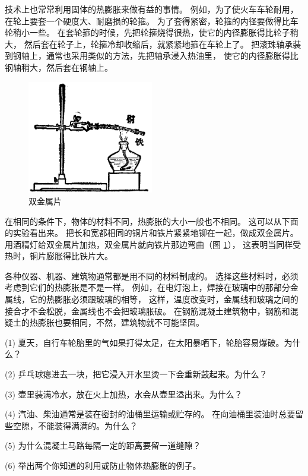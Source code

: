 技术上也常常利用固体的热膨胀来做有益的事情。
例如，为了使火车车轮耐用，在轮上要套一个硬度大、耐磨损的轮箍。
为了套得紧密，轮箍的内径要做得比车轮稍小一些。
在套轮箍的时候，先把轮箍烧得很热，使它的内径膨胀得比轮子稍大，
然后套在轮子上，轮箍冷却收缩后，就紧紧地箍在车轮上了。
把滚珠轴承装到钢轴上，通常也采用类似的方法，先把轴承浸入热油里，
使它的内径膨胀得比钢轴稍大，然后套在钢轴上。

\begin{figure}
    \centering
    \includegraphics[width=5.5cm]{../pic/czwl2-ch2-7}
    \caption{双金属片}\label{fig:2-7}
\end{figure}

在相同的条件下，物体的材料不同，热膨胀的大小一般也不相同。
这可以从下面的实验看出来。
把长和宽都相同的铜片和铁片紧紧地铆在一起，做成双金属片。
用酒精灯给双金属片加热，双金属片就向铁片那边弯曲（图 \ref{fig:2-7}），
这表明当同样受热时，铜片膨胀得比铁片大。

各种仪器、机器、建筑物通常都是用不同的材料制成的。
选择这些材料时，必须考虑到它们的热膨胀是不是一样。
例如，在电灯泡上，焊接在玻璃中的那部分金属线，它的热膨胀必须跟玻璃的相等，
这样，温度改变时，金属线和玻璃之间的接合才不会松脱，金属线也不会把玻璃胀破。
在钢筋混凝土建筑物中，钢筋和混疑土的热膨胀也要相同，不然，建筑物就不可能坚固。


\lianxi

(1) 夏天，自行车轮胎里的气如果打得太足，在太阳暴哂下，轮胎容易爆破。为什么？

(2) 乒乓球瘪进去一块，把它浸入开水里烫一下会重新鼓起来。为什么？

(3) 壶里装满冷水，放在火上加热，水会从壶里溢出来。为什么？

(4) 汽油、柴油通常是装在密封的油桶里运输或贮存的。
在向油桶里装油时总要留些空隙，不能装得满满的。为什么？

(5) 为什么混凝土马路每隔一定的距离要留一道缝隙？

(6) 举出两个你知道的利用或防止物体热膨胀的例子。




